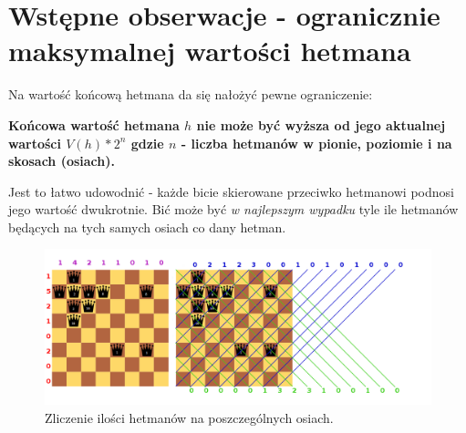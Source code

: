 \documentclass{article}
\begin{document}
\section{Wstępne obserwacje - ogranicznie maksymalnej wartości hetmana}

Na wartość końcową hetmana da się nałożyć pewne ograniczenie:

\textbf{Końcowa wartość hetmana $h$ nie może być wyższa od jego aktualnej wartości $V(h) * 2^n$ gdzie $n$ - liczba hetmanów w pionie, poziomie i na skosach (osiach).}

Jest to łatwo udowodnić - każde bicie skierowane przeciwko hetmanowi podnosi jego wartość dwukrotnie. Bić może być \textit{w najlepszym wypadku} tyle ile hetmanów będących na tych samych osiach co dany hetman.

\begin{figure}[!ht]
  \centering
      \includegraphics[scale=0.3]{obs1.png}
  \caption{Zliczenie ilości hetmanów na poszczególnych osiach.}
\end{figure}
\end{document}
